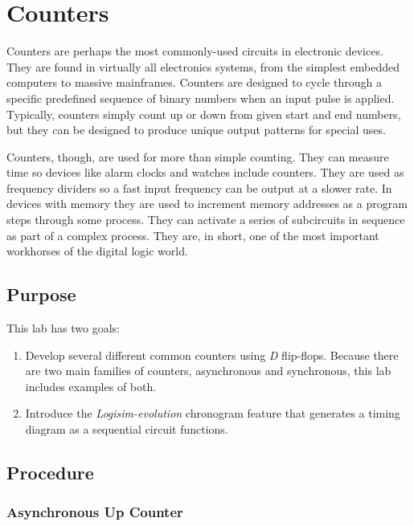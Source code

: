 \chapter{Counters}

Counters are perhaps the most commonly-used circuits in electronic devices. They are found in virtually all electronics systems, from the simplest embedded computers to massive mainframes. Counters are designed to cycle through a specific predefined sequence of binary numbers when an input pulse is applied. Typically, counters simply count up or down from given start and end numbers, but they can be designed to produce unique output patterns for special uses. 

Counters, though, are used for more than simple counting. They can measure time so devices like alarm clocks and watches include counters. They are used as frequency dividers so a fast input frequency can be output at a slower rate. In devices with memory they are used to increment memory addresses as a program steps through some process. They can activate a series of subcircuits in sequence as part of a complex process. They are, in short, one of the most important workhorses of the digital logic world.

\section{Purpose}

This lab has two goals: 

\begin{enumerate}
	\item Develop several different common counters using \textit{D} flip-flops. Because there are two main families of counters, asynchronous and synchronous, this lab includes examples of both. 
	\item Introduce the \textit{Logisim-evolution} chronogram feature that generates a timing diagram as a sequential circuit functions. 
\end{enumerate}

\section{Procedure}

\subsection{Asynchronous Up Counter}

